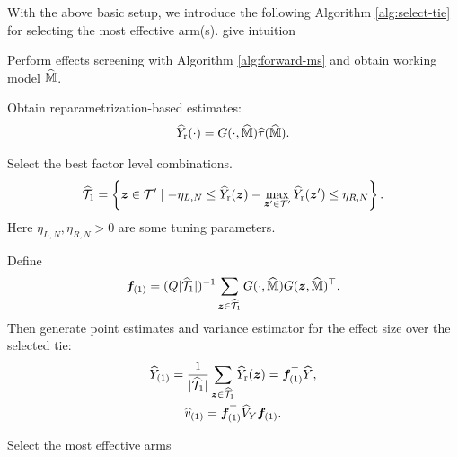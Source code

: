 \documentclass[12pt]{article}
\begin{document}
With the above basic setup, we introduce the following  Algorithm \ref{alg:select-tie} for selecting the most effective arm(s). {\color{red} give intuition}
\begin{algorithm}[!ht]
\DontPrintSemicolon
{}                %


    
    Perform effects screening with Algorithm \ref{alg:forward-ms} and obtain working model $\widehat{{\mathbb{M}}}$.
    
    Obtain reparametrization-based estimates:
      \begin{align*}
           \widehat{Y}_{\operatorname{r}}(\cdot) = G(\cdot,{\widehat{{\mathbb{M}}}}) {\widehat{\tau}}(\widehat{{\mathbb{M}}}).
      \end{align*}
      
    Select the best factor level combinations. 
    \begin{align*}
          \widehat{{\mathcal{T}}}_{1} = \left\{{\boldsymbol{z}}\in{\mathcal{T}}'\mid -\eta_{L,N}\le {\widehat{Y}}_{\operatorname{r}}({\boldsymbol{z}})-\max_{{\boldsymbol{z}}'\in{\mathcal{T}}' }{\widehat{Y}}_{\operatorname{r}}({\boldsymbol{z}}') \le \eta_{R,N}\right\}.
      \end{align*}
    Here $\eta_{L,N},\eta_{R,N}>0$ are some tuning parameters.  
    
    Define
    \begin{align*}
    {\boldsymbol{f}}_{(1)}=(Q|\widehat{{\mathcal{T}}}_{1}|)^{-1}\sum_{{\boldsymbol{z}}\in \widehat{{\mathcal{T}}}_{1}}G(\cdot,{\widehat{{\mathbb{M}}}}) G({{\boldsymbol{z}}, \widehat{{\mathbb{M}}}})^\top.
    \end{align*}
    Then generate point estimates and variance estimator for the effect size over the selected tie:
      \begin{gather*}
         {\widehat{Y}}_{(1)} = \frac{1}{|\widehat{{\mathcal{T}}}_{1}|} \sum_{{\boldsymbol{z}}\in \widehat{{\mathcal{T}}}_{1}} {\widehat{Y}}_{\operatorname{r}}({\boldsymbol{z}}) = {\boldsymbol{f}}_{(1)}^\top{\widehat{Y}} , \\
         \widehat{v}_{(1)} = {\boldsymbol{f}}_{(1)}^\top {\widehat{V}}_Y {\boldsymbol{f}}_{(1)}.
      \end{gather*}
    
    
    
\caption{Select the most effective arms}
\label{alg:select-tie}
\end{algorithm}
\end{document}
